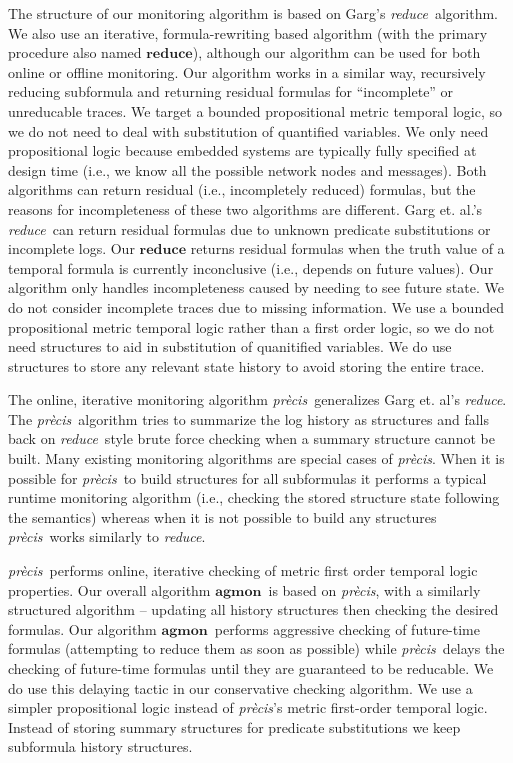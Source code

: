 \documentclass[]{../llncs/llncs}
\newcommand{\agmon}{\ensuremath{\mathbf{agmon}}}
\newcommand{\precis}{\textit{pr\`ecis}}
\newcommand{\greduce}{\textit{reduce}}
\begin{document}
The structure of our monitoring algorithm is based on Garg's \greduce\ algorithm. 
We also use an iterative, formula-rewriting based algorithm (with the primary procedure also named $\mathbf{reduce}$), although our algorithm can be used for both online or offline monitoring. 
Our algorithm works in a similar way, recursively reducing subformula and returning residual formulas for ``incomplete'' or unreducable traces. We target a bounded propositional metric temporal logic, so we do not need to deal with substitution of quantified variables. We only need propositional logic because embedded systems are typically fully specified at design time (i.e., we know all the possible network nodes and messages).
%
Both algorithms can return residual (i.e., incompletely reduced) formulas, but the reasons for incompleteness of these two algorithms are different. Garg et. al.'s \greduce\ can return residual formulas due to unknown predicate substitutions or incomplete logs. Our $\mathbf{reduce}$ returns residual formulas when the truth value of a temporal formula is currently inconclusive (i.e., depends on future values).
%
Our algorithm only handles incompleteness caused by needing to see future state. We do not consider incomplete traces due to missing information. 
We use a bounded propositional metric temporal logic rather than a first order logic, so we do not need structures to aid in substitution of quanitified variables. 
We do use structures to store any relevant state history to avoid storing the entire trace.

The online, iterative monitoring algorithm \precis\ generalizes Garg et. al's \greduce. 
The \precis\ algorithm tries to summarize the log history as structures and falls back on \greduce\ style brute force checking when a summary structure cannot be built.
Many existing monitoring algorithms are special cases of \precis.
When it is possible for \precis\ to build structures for all subformulas it performs a typical runtime monitoring algorithm (i.e., checking the stored structure state following the semantics) whereas when it is not possible to build any structures \precis\ works similarly to \greduce.

\precis\ performs online, iterative checking of metric first order temporal logic properties. 
Our overall algorithm \agmon\ is based on \precis, with a similarly structured algorithm -- updating all history structures then checking the desired formulas. Our algorithm \agmon\ performs aggressive checking of future-time formulas (attempting to reduce them as soon as possible) while \precis\ delays the checking of future-time formulas until they are guaranteed to be reducable. We do use this delaying tactic in our conservative checking algorithm.
We use a simpler propositional logic instead of \precis{}'s metric first-order temporal logic. Instead of storing summary structures for predicate substitutions we keep subformula history structures.
\end{document}
